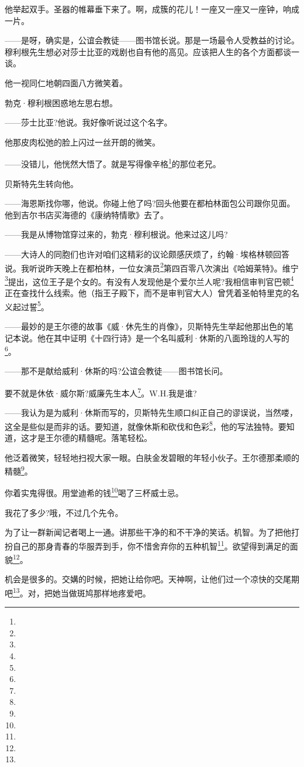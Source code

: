 \par 他举起双手。圣器的帷幕垂下来了。啊，成簇的花儿！一座又一座又一座钟，响成一片。
\par ——是呀，确实是，公谊会教徒——图书馆长说。那是一场最令人受教益的讨论。穆利根先生想必对莎士比亚的戏剧也自有他的高见。应该把人生的各个方面都谈一谈。
\par 他一视同仁地朝四面八方微笑着。
\par 勃克·穆利根困惑地左思右想。
\par ——莎士比亚?他说。我好像听说过这个名字。
\par 他那皮肉松弛的脸上闪过一丝开朗的微笑。
\par ——没错儿，他恍然大悟了。就是写得像辛格\footnote{}的那位老兄。
\par 贝斯特先生转向他。
\par ——海恩斯找你哪，他说。你碰上他了吗?回头他要在都柏林面包公司跟你见面。他到吉尔书店买海德的《康纳特情歌》去了。
\par ——我是从博物馆穿过来的，勃克·穆利根说。他来过这儿吗?
\par ——大诗人的同胞们也许对咱们这精彩的议论颇感厌烦了，约翰·埃格林顿回答说。我听说昨天晚上在都柏林，一位女演员\footnote{}第四百零八次演出《哈姆莱特》。维宁\footnote{}提出，这位王子是个女的。有没有人发现他是个爱尔兰人呢?我相信审判官巴顿\footnote{}正在查找什么线索。他（指王子殿下，而不是审判官大人）曾凭着圣帕特里克的名义起过誓\footnote{}。
\par ——最妙的是王尔德的故事《威·休先生的肖像》，贝斯特先生举起他那出色的笔记本说。他在其中证明《十四行诗》是一个名叫威利·休斯的八面玲珑的人写的\footnote{}。
\par ——那不是献给威利·休斯的吗?公谊会教徒——图书馆长问。
\par 要不就是休依·威尔斯?威廉先生本人\footnote{}。W.H.我是谁?
\par ——我认为是为威利·休斯而写的，贝斯特先生顺口纠正自己的谬误说，当然喽，这全是些似是而非的话。要知道，就像休斯和砍伐和色彩\footnote{}，他的写法独特。要知道，这才是王尔德的精髓呢。落笔轻松。
\par 他泛着微笑，轻轻地扫视大家一眼。白肤金发碧眼的年轻小伙子。王尔德那柔顺的精髓\footnote{}。
\par 你着实鬼得很。用堂迪希的钱\footnote{}喝了三杯威士忌。
\par 我花了多少?哦，不过几个先令。
\par 为了让一群新闻记者喝上一通。讲那些干净的和不干净的笑话。机智。为了把他打扮自己的那身青春的华服弄到手，你不惜舍弃你的五种机智\footnote{}。欲望得到满足的面貌\footnote{}。
\par 机会是很多的。交媾的时候，把她让给你吧。天神啊，让他们过一个凉快的交尾期吧\footnote{}。对，把她当做斑鸠那样地疼爱吧。

